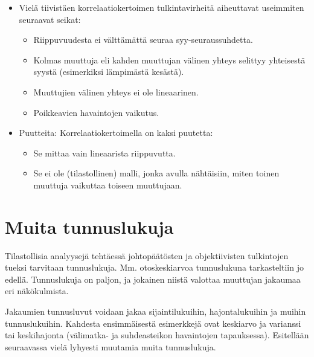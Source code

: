 \documentclass[
]{book}
\providecommand{\tightlist}{%
  \setlength{\itemsep}{0pt}\setlength{\parskip}{0pt}}
\begin{document}
\FloatBarrier

\begin{itemize}
\tightlist
\item
  Vielä tiivistäen korrelaatiokertoimen tulkintavirheitä aiheuttavat useimmiten seuraavat seikat:

  \begin{itemize}
  \tightlist
  \item
    Riippuvuudesta ei välttämättä seuraa syy-seuraussuhdetta.
  \item
    Kolmas muuttuja eli kahden muuttujan välinen yhteys selittyy yhteisestä syystä (esimerkiksi lämpimästä kesästä).
  \item
    Muuttujien välinen yhteys ei ole lineaarinen.
  \item
    Poikkeavien havaintojen vaikutus.
  \end{itemize}
\item
  Puutteita: Korrelaatiokertoimella on kaksi puutetta:

  \begin{itemize}
  \tightlist
  \item
    Se mittaa vain lineaarista riippuvutta.
  \item
    Se ei ole (tilastollinen) malli, jonka avulla nähtäisiin, miten toinen muuttuja vaikuttaa toiseen muuttujaan.
  \end{itemize}
\end{itemize}

\hypertarget{alaluku65}{%
\section{Muita tunnuslukuja}\label{alaluku65}}

Tilastollisia analyysejä tehtäessä johtopäätösten ja objektiivisten tulkintojen tueksi tarvitaan tunnuslukuja. Mm. otoskeskiarvoa tunnuslukuna tarkasteltiin jo edellä. Tunnuslukuja on paljon, ja jokainen niistä valottaa muuttujan jakaumaa eri näkökulmista.

Jakaumien tunnusluvut voidaan jakaa sijaintilukuihin, hajontalukuihin ja muihin tunnuslukuihin. Kahdesta ensimmäisestä esimerkkejä ovat keskiarvo ja varianssi tai keskihajonta (välimatka- ja suhdeasteikon havaintojen tapauksessa). Esitellään seuraavassa vielä lyhyesti muutamia muita tunnuslukuja.
\end{document}

